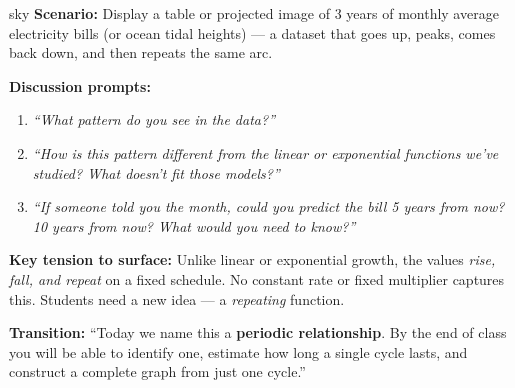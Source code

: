 \documentclass[10pt]{article}
\begin{document}
\vspace{0.08in}

\begin{skillbox}{sky}
\textbf{Scenario:} Display a table or projected image of 3 years of monthly
average electricity bills (or ocean tidal heights) — a dataset that goes up,
peaks, comes back down, and then repeats the same arc.

\textbf{Discussion prompts:}
\begin{enumerate}[leftmargin=1.4em, itemsep=3pt]
  \item \textit{``What pattern do you see in the data?''}
  \item \textit{``How is this pattern different from the linear or exponential
    functions we've studied? What doesn't fit those models?''}
  \item \textit{``If someone told you the month, could you predict the bill 5
    years from now? 10 years from now? What would you need to know?''}
\end{enumerate}

\textbf{Key tension to surface:} Unlike linear or exponential growth,
the values \textit{rise, fall, and repeat} on a fixed schedule. No constant
rate or fixed multiplier captures this. Students need a new idea --- a
\textit{repeating} function.

\textbf{Transition:} ``Today we name this a \textbf{periodic relationship}.
By the end of class you will be able to identify one, estimate how long a
single cycle lasts, and construct a complete graph from just one cycle.''
\end{skillbox}

\vspace{0.08in}
\end{document}
